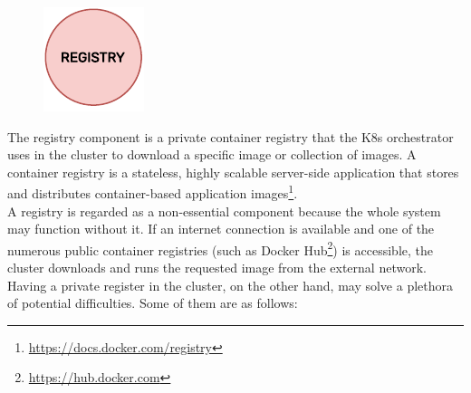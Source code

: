 \begin{figure}
  \centering
  \includegraphics[width=\linewidth]{images/architecture/registry.pdf}
\end{figure}

The registry component is a private container registry that the K8s orchestrator
uses in the cluster to download a specific image or collection of images. A
container registry is a stateless, highly scalable server-side application that stores
and distributes container-based application images\footnote{\url{https://docs.docker.com/registry}}.
\\ %
A registry is regarded as a non-essential component because the whole system may
function without it. If an internet connection is available and one of the
numerous public container registries (such as Docker Hub\footnote{\url{https://hub.docker.com}})
is accessible, the cluster downloads and runs the requested image from the external
network. Having a private register in the cluster, on the other hand, may solve
a plethora of potential difficulties. Some of them are as follows:

